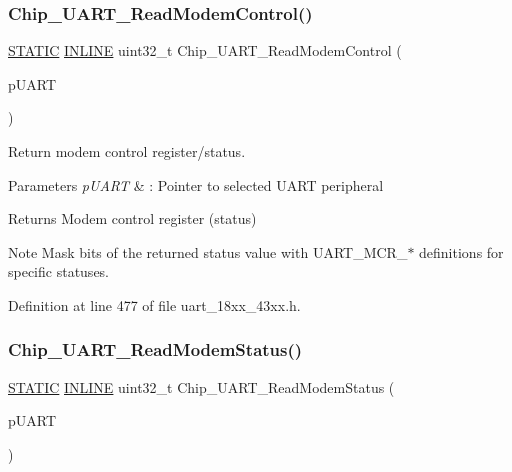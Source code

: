 \subsubsection{\texorpdfstring{Chip\+\_\+\+U\+A\+R\+T\+\_\+\+Read\+Modem\+Control()}{Chip\_UART\_ReadModemControl()}}
{\footnotesize\ttfamily \hyperlink{group___l_p_c___types___public___macros_ga10b2d890d871e1489bb02b7e70d9bdfb}{S\+T\+A\+T\+IC} \hyperlink{spifi__18xx__43xx_8h_a2eb6f9e0395b47b8d5e3eeae4fe0c116}{I\+N\+L\+I\+NE} uint32\+\_\+t Chip\+\_\+\+U\+A\+R\+T\+\_\+\+Read\+Modem\+Control (\begin{DoxyParamCaption}\item[{\hyperlink{struct_l_p_c___u_s_a_r_t___t}{L\+P\+C\+\_\+\+U\+S\+A\+R\+T\+\_\+T} $\ast$}]{p\+U\+A\+RT }\end{DoxyParamCaption})}



Return modem control register/status. 


\begin{DoxyParams}{Parameters}
{\em p\+U\+A\+RT} & \+: Pointer to selected U\+A\+RT peripheral \\
\hline
\end{DoxyParams}
\begin{DoxyReturn}{Returns}
Modem control register (status) 
\end{DoxyReturn}
\begin{DoxyNote}{Note}
Mask bits of the returned status value with U\+A\+R\+T\+\_\+\+M\+C\+R\+\_\+$\ast$ definitions for specific statuses. 
\end{DoxyNote}


Definition at line 477 of file uart\+\_\+18xx\+\_\+43xx.\+h.

\mbox{\label{group___u_a_r_t__18_x_x__43_x_x_gacd3d5239dec0378e52602633c183e942}} 
\subsubsection{\texorpdfstring{Chip\+\_\+\+U\+A\+R\+T\+\_\+\+Read\+Modem\+Status()}{Chip\_UART\_ReadModemStatus()}}
{\footnotesize\ttfamily \hyperlink{group___l_p_c___types___public___macros_ga10b2d890d871e1489bb02b7e70d9bdfb}{S\+T\+A\+T\+IC} \hyperlink{spifi__18xx__43xx_8h_a2eb6f9e0395b47b8d5e3eeae4fe0c116}{I\+N\+L\+I\+NE} uint32\+\_\+t Chip\+\_\+\+U\+A\+R\+T\+\_\+\+Read\+Modem\+Status (\begin{DoxyParamCaption}\item[{\hyperlink{struct_l_p_c___u_s_a_r_t___t}{L\+P\+C\+\_\+\+U\+S\+A\+R\+T\+\_\+T} $\ast$}]{p\+U\+A\+RT }\end{DoxyParamCaption})}



